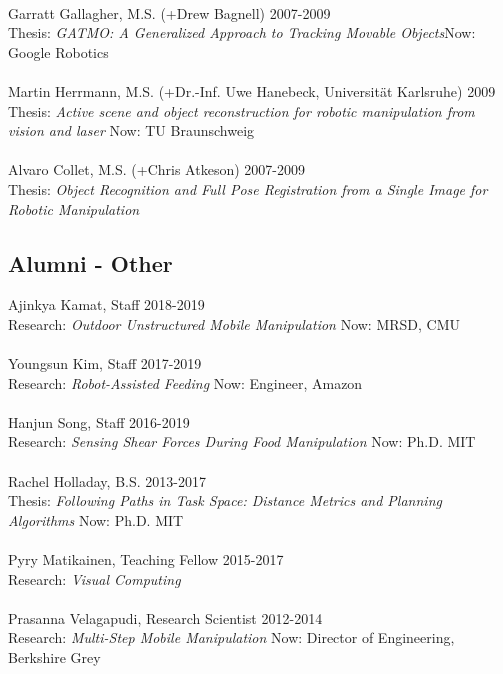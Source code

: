 \\
Garratt Gallagher, M.S. (+Drew Bagnell) \hfill 2007-2009\\ 
Thesis: \textit{GATMO: A Generalized Approach to Tracking Movable Objects}\hfill Now: Google Robotics\\
\\
Martin Herrmann, M.S. (+Dr.-Inf. Uwe Hanebeck, Universit\"at Karlsruhe) \hfill 2009\\
Thesis: \textit{Active scene and object reconstruction for robotic manipulation from vision and laser} \hfill Now: TU Braunschweig\\
\\
Alvaro Collet, M.S. (+Chris Atkeson) \hfill 2007-2009\\
Thesis: \textit{Object Recognition and Full Pose Registration from a Single Image for Robotic Manipulation}\\
\subsection{Alumni - Other}
\noindent
Ajinkya Kamat, Staff \hfill 2018-2019\\
Research: \textit{Outdoor Unstructured Mobile Manipulation} \hfill Now: MRSD, CMU\\
\\
Youngsun Kim, Staff \hfill 2017-2019\\
Research: \textit{Robot-Assisted Feeding} \hfill Now: Engineer, Amazon\\
\\
Hanjun Song, Staff \hfill 2016-2019\\
Research: \textit{Sensing Shear Forces During Food Manipulation} \hfill Now: Ph.D. MIT\\
\\
Rachel Holladay, B.S. \hfill 2013-2017\\
Thesis: \textit{Following Paths in Task Space: Distance Metrics and Planning Algorithms} \hfill Now: Ph.D. MIT\\
\\
Pyry Matikainen, Teaching Fellow \hfill 2015-2017 
\\Research: \textit{Visual Computing} \\
\\
Prasanna Velagapudi, Research Scientist \hfill 2012-2014\\
Research: \textit{Multi-Step Mobile Manipulation }\hfill Now: Director of Engineering, Berkshire Grey\\
\\


